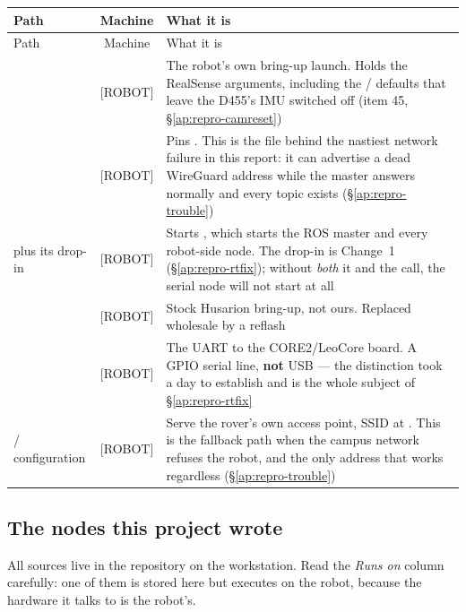 \begin{longtable}{@{}L{5.6cm}cL{6.4cm}@{}}
\toprule
Path & Machine & What it is \\
\midrule
\endfirsthead
\toprule
Path & Machine & What it is \\
\midrule
\endhead
{} & [ROBOT] &
  The robot's own bring-up launch. Holds the RealSense arguments, including
  the / defaults that leave the D455's
  IMU switched off (item 45, \S\ref{ap:repro-camreset}) \\
\addlinespace
{} & [ROBOT] &
  Pins . This is the file behind the nastiest network failure
  in this report: it can advertise a dead WireGuard address while the master
  answers normally and every topic exists (\S\ref{ap:repro-trouble}) \\
\addlinespace
{} \newline plus its 
  drop-in & [ROBOT] &
  Starts , which starts the ROS master and every robot-side
  node. The drop-in is Change~1 (\S\ref{ap:repro-rtfix}); without \emph{both}
  it and the  call, the serial node will not start at all \\
\addlinespace
{} \newline {}
  & [ROBOT] &
  Stock Husarion bring-up, not ours. Replaced wholesale by a reflash \\
\addlinespace
{} & [ROBOT] &
  The UART to the CORE2/LeoCore board. A GPIO serial line, \textbf{not} USB
  --- the distinction took a day to establish and is the whole subject of
  \S\ref{ap:repro-rtfix} \\
\addlinespace
{} /  configuration & [ROBOT] &
  Serve the rover's own access point, SSID  at
  . This is the fallback path when the campus network refuses
  the robot, and the only address that works regardless
  (\S\ref{ap:repro-trouble}) \\
\bottomrule
\end{longtable}

\subsection{The nodes this project wrote}
\label{ap:repro-inv-nodes}

All sources live in the repository on the workstation. Read the
\emph{Runs on} column carefully: one of them is stored here but executes on
the robot, because the hardware it talks to is the robot's.

